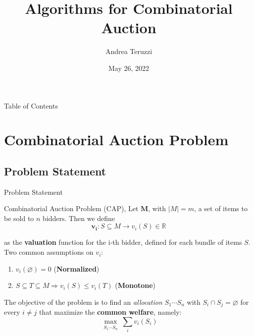 \documentclass[aspectratio=169,xcolor=dvipsnames]{beamer}
\title[Algorithms for Combinatorial Auction]{Algorithms for Combinatorial Auction} %
\author[Andrea Teruzzi] {Andrea Teruzzi}
\date[20602 - Computer Science (Algorithms)]{May 26, 2022}
\begin{document}
    
    \begin{frame}
        \titlepage
    \end{frame}
     \begin{frame}{Table of Contents}
        \tableofcontents
    \end{frame}
    
    
    \section{Combinatorial Auction Problem}
    \subsection{Problem Statement }
    \begin{frame}{Problem Statement }
    \begin{block}{Combinatorial Auction Problem (CAP), \cite{algo_gt_nisan_ch11}}
    Let $\boldsymbol{M}$, with $|M| = m $, a set of items to be sold to $n$ bidders. Then we define
    $$
    \boldsymbol{v_i}: S \subseteq M\rightarrow v_i(S) \in \mathbb{R}
    $$
    
    as the \textbf{valuation} function for the i-th bidder, defined for each bundle of items $S$.\\
    Two common assumptions on $v_i$:
    \begin{enumerate}
        \item $v_i(\varnothing) = 0$ (\textbf{Normalized})
        \item $ S \subseteq T \subseteq M \Rightarrow v_i(S) \leq v_i(T) $
        (\textbf{Monotone})
    \end{enumerate}
    The objective of the problem is to find an \textit{allocation} $S_1 \cdots S_n$ with $S_i \cap S_j = \varnothing$  for every $ i \neq j$  that maximize the \textbf{common welfare}, namely:
    $$
    \max_{\substack{S_1 \cdots S_n}} \sum_{i} v_i(S_i) 
    $$
    \end{block}
    \end{frame}
\end{document}
